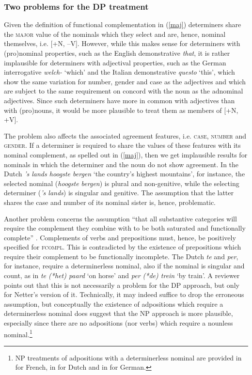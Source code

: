 \documentclass[output=paper
                ,modfonts
                ,nonflat
	        ,collection
	        ,collectionchapter
	        ,collectiontoclongg
 	        ,biblatex
                ,babelshorthands
                ,newtxmath
                ,draftmode
                ,colorlinks, citecolor=brown
]{./langsci/langscibook}
\begin{document}
\subsubsection{Two problems for the DP treatment}  
\label{prob}


Given the definition of functional complementation in (\ref{maj})
determiners share the \textsc{major} value of the nominals which they select
and are, hence, nominal themselves, i.e. [+N, --V].
However, while this makes sense for determiners with (pro)nominal properties,
such as the English demonstrative \emph{that}, 
it is rather implausible for determiners with adjectival properties,
such as the German interrogative \emph{welch-} `which' and 
the Italian demonstrative \emph{questo} `this', which show the same variation for 
number, gender and case as the adjectives and which are subject to 
the same requirement on concord with the noun as the adnominal adjectives. 
Since such determiners have more in common with adjectives than with (pro)nouns,  
it would be more plausible to treat them as members of [+N, +V].  

The problem also affects the associated agreement features, i.e. \textsc{case}, 
\textsc{number} and \textsc{gender}. If a determiner 
is required to share the values of these features with its nominal complement,
as spelled out in (\ref{maj}), then we get implausible results for nominals in 
which the determiner and the noun do not show agreement.    
In the Dutch \emph{'s lands hoogste bergen} `the country's highest mountains', 
for instance, the selected nominal (\emph{hoogste bergen}) is plural and non-genitive, 
while the selecting determiner (\emph{'s lands}) is singular and genitive.  
The assumption that the latter shares the case and number of its nominal sister 
is, hence, problematic.

Another problem concerns the assumption ``that all substantive categories will 
require the complement they combine with to be both saturated and functionally complete''
\citep[311]{Netter94}. Complements of verbs and prepositions must, hence, be positively 
specified for \textsc{fcompl}. This is contradicted by the existence of
prepositions which require their complement to be functionally incomplete. 
The Dutch \emph{te} and \emph{per}, for instance, require a determinerless nominal,
also if the nominal is singular and count, as in \emph{te (*het) paard} `on horse' 
and \emph{per (*de) trein} `by train'. A reviewer points out that this is 
not necessarily a problem for the DP approach, but only for Netter's version of it. 
Technically, it may indeed suffice to drop the erroneous assumption, but 
conceptually the existence of adpositions which require a determinerless nominal 
does suggest that the NP approach is more plausible, especially since 
there are no adpositions (nor verbs) which require a nounless nominal.\footnote{NP 
treatments of adpositions with a determinerless nominal are provided in \citet{Tseng00}
for French, in \citet{VanEynde04} for Dutch and in \citet{Kiss08} for German.}    
\end{document}
